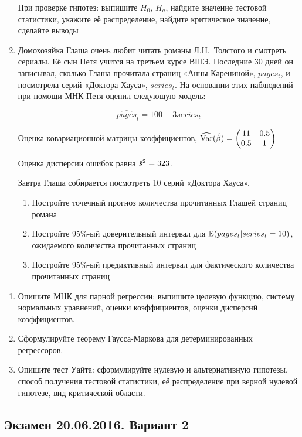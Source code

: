 \documentclass[12pt, a4paper]{article}
\begin{document}
\begin{enumerate}
При проверке гипотез: выпишите $H_0$, $H_a$, найдите значение тестовой статистики, укажите её распределение, найдите критическое значение, сделайте выводы


\item Домохозяйка Глаша очень любит читать романы Л.Н.~Толстого и смотреть сериалы. Её сын Петя учится на третьем курсе ВШЭ.  Последние 30 дней он записывал, сколько Глаша прочитала страниц «Анны Карениной», $pages_t$, и посмотрела серий «Доктора Хауса», $series_t$. На основании этих наблюдений при помощи МНК Петя оценил следующую модель:

\[
\widehat{pages}_t=100-3series_t
\]

Оценка ковариационной матрицы коэффициентов,
$\widehat{\operatorname{Var}}(\hat{\beta}) = \begin{pmatrix}
11 & 0.5 \\
0.5 & 1\\
\end{pmatrix}$

Оценка дисперсии ошибок равна $\hat{s}^2=323$.

Завтра Глаша собирается посмотреть 10 серий «Доктора Хауса».

\begin{enumerate}
\item Постройте точечный прогноз количества прочитанных Глашей страниц романа
\item Постройте 95\%-ый доверительный интервал для $\mathbb{E}(pages_t |series_t=10)$, ожидаемого количества прочитанных страниц
\item	Постройте 95\%-ый предиктивный интервал для фактического количества прочитанных страниц
\end{enumerate}


\end{enumerate}


\begin{enumerate}[resume]
\item Опишите МНК для парной регрессии: выпишите целевую функцию, систему нормальных уравнений, оценки коэффициентов, оценки дисперсий коэффициентов.
\item Сформулируйте теорему Гаусса-Маркова для детерминированных регрессоров.
\item Опишите тест Уайта: сформулируйте нулевую и альтернативную гипотезы, способ получения тестовой статистики, её распределение при верной нулевой гипотезе, вид критической области.
\end{enumerate}

\subsection{Экзамен 20.06.2016. Вариант 2}
\end{document}

